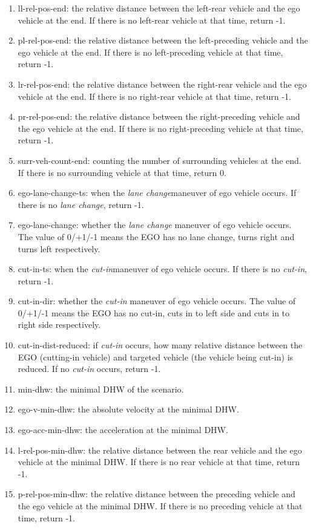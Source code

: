 \documentclass[conference]{IEEEtran}
\begin{document}
\begin{enumerate}
\item ll-rel-pos-end: the relative distance between the left-rear vehicle and the ego vehicle at the end. If there is no left-rear vehicle at that time, return -1.
\item pl-rel-pos-end: the relative distance between the left-preceding vehicle and the ego vehicle at the end. If there is no left-preceding vehicle at that time, return -1.
\item lr-rel-pos-end: the relative distance between the right-rear vehicle and the ego vehicle at the end. If there is no right-rear vehicle at that time, return -1.
\item pr-rel-pos-end: the relative distance between the right-preceding vehicle and the ego vehicle at the end. If there is no right-preceding vehicle at that time, return -1.
\item surr-veh-count-end: counting the number of surrounding vehicles at the end. If there is no surrounding vehicle at that time, return 0.
\item ego-lane-change-ts: when the \textit{lane change}maneuver of ego vehicle occurs. If there is no \textit{lane change}, return -1.
\item ego-lane-change: whether the \textit{lane change} maneuver of ego vehicle occurs. The value of 0/+1/-1 means the EGO has no lane change, turns right and turns left respectively.
\item cut-in-ts: when the \textit{cut-in}maneuver of ego vehicle occurs. If there is no \textit{cut-in}, return -1.
\item cut-in-dir: whether the \textit{cut-in} maneuver of ego vehicle occurs. The value of 0/+1/-1 means the EGO has no cut-in, cuts in to left side and cuts in to right side respectively.
\item cut-in-dist-reduced: if \textit{cut-in} occurs, how many relative distance between the EGO (cutting-in vehicle) and targeted vehicle (the vehicle being cut-in) is reduced. If no \textit{cut-in} occurs, return -1.
\item min-dhw: the minimal DHW of the scenario.
\item ego-v-min-dhw: the absolute velocity at the minimal DHW.
\item ego-acc-min-dhw: the acceleration at the minimal DHW.
\item l-rel-pos-min-dhw: the relative distance between the rear vehicle and the ego vehicle at the minimal DHW. If there is no rear vehicle at that time, return -1.
\item p-rel-pos-min-dhw: the relative distance between the preceding vehicle and the ego vehicle at the minimal DHW. If there is no preceding vehicle at that time, return -1.

\end{enumerate}
\end{document}
